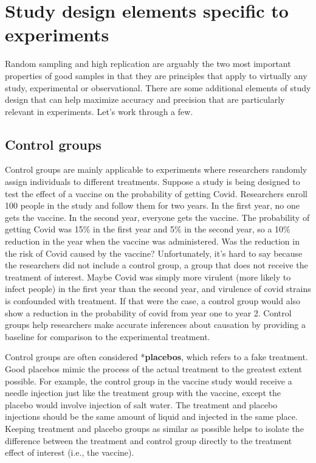 \documentclass[
]{book}
\begin{document}
\section{Study design elements specific to experiments}\label{study-design-elements-specific-to-experiments}

Random sampling and high replication are arguably the two most important properties of good samples in that they are principles that apply to virtually any study, experimental or observational. There are some additional elements of study design that can help maximize accuracy and precision that are particularly relevant in experiments. Let's work through a few.

\subsection{Control groups}\label{control-groups}

Control groups are mainly applicable to experiments where researchers randomly assign individuals to different treatments. Suppose a study is being designed to test the effect of a vaccine on the probability of getting Covid. Researchers enroll 100 people in the study and follow them for two years. In the first year, no one gets the vaccine. In the second year, everyone gets the vaccine. The probability of getting Covid was 15\% in the first year and 5\% in the second year, so a 10\% reduction in the year when the vaccine was administered. Was the reduction in the risk of Covid caused by the vaccine? Unfortunately, it's hard to say because the researchers did not include a control group, a group that does not receive the treatment of interest. Maybe Covid was simply more virulent (more likely to infect people) in the first year than the second year, and virulence of covid strains is confounded with treatment. If that were the case, a control group would also show a reduction in the probability of covid from year one to year 2. Control groups help researchers make accurate inferences about causation by providing a baseline for comparison to the experimental treatment.

Control groups are often considered *\textbf{placebos}, which refers to a fake treatment. Good placebos mimic the process of the actual treatment to the greatest extent possible. For example, the control group in the vaccine study would receive a needle injection just like the treatment group with the vaccine, except the placebo would involve injection of salt water. The treatment and placebo injections should be the same amount of liquid and injected in the same place. Keeping treatment and placebo groups as similar as possible helps to isolate the difference between the treatment and control group directly to the treatment effect of interest (i.e., the vaccine).
\end{document}
